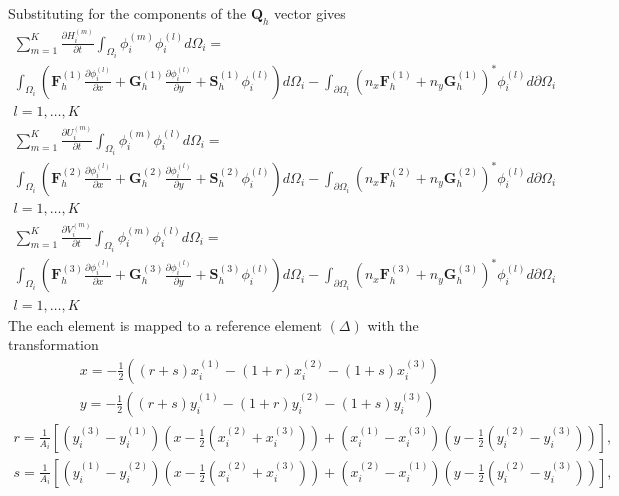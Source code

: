 \documentclass[11pt]{article}
\begin{document}
Substituting for the components of the $\mathbf{Q}_h$ vector gives 
\begin{multline}
\displaystyle\sum_{m=1}^K\frac{\partial H_i^{(m)}}{\partial t}\int_{\Omega_i}\phi_i^{(m)}\phi_i^{(l)} d\Omega_i = \\ \int_{\Omega_i}\left(\mathbf{F}^{(1)}_h\frac{\partial \phi_i^{(l)}}{\partial x} + \mathbf{G}^{(1)}_h\frac{\partial \phi_i^{(l)}}{\partial y} + \mathbf{S}^{(1)}_h\phi_i^{(l)} \right)d\Omega_i - \int_{\partial \Omega_i} \left(n_x\mathbf{F}^{(1)}_h + n_y\mathbf{G}^{(1)}_h\right)^*\phi_i^{(l)} d\partial \Omega_i  \\ l = 1,\ldots,K
\end{multline}
\begin{multline}
\displaystyle\sum_{m=1}^K\frac{\partial U_i^{(m)}}{\partial t}\int_{\Omega_i}\phi_i^{(m)}\phi_i^{(l)} d\Omega_i = \\ \int_{\Omega_i}\left(\mathbf{F}^{(2)}_h\frac{\partial \phi_i^{(l)}}{\partial x} + \mathbf{G}^{(2)}_h\frac{\partial \phi_i^{(l)}}{\partial y} + \mathbf{S}^{(2)}_h\phi_i^{(l)}\right)d\Omega_i - \int_{\partial \Omega_i} \left(n_x\mathbf{F}^{(2)}_h + n_y\mathbf{G}^{(2)}_h\right)^*\phi_i^{(l)} d\partial \Omega_i  \\ l = 1,\ldots,K
\end{multline}
\begin{multline}
\displaystyle\sum_{m=1}^K\frac{\partial V_i^{(m)}}{\partial t}\int_{\Omega_i}\phi_i^{(m)}\phi_i^{(l)} d\Omega_i = \\ \int_{\Omega_i}\left(\mathbf{F}^{(3)}_h\frac{\partial \phi_i^{(l)}}{\partial x} + \mathbf{G}^{(3)}_h\frac{\partial \phi_i^{(l)}}{\partial y} + \mathbf{S}^{(3)}_h\phi_i^{(l)}\right)d\Omega_i - \int_{\partial \Omega_i} \left(n_x\mathbf{F}^{(3)}_h + n_y\mathbf{G}^{(3)}_h\right)^*\phi_i^{(l)} d\partial \Omega_i   \\ l = 1,\ldots,K
\end{multline}
The each element is mapped to a reference element $(\Delta)$ with the transformation
\begin{align}
x = -\frac{1}{2} \left((r+s)x_i^{(1)} - (1+r)x_i^{(2)} - (1+s)x_i^{(3)} \right)\\
y = -\frac{1}{2} \left((r+s)y_i^{(1)} - (1+r)y_i^{(2)} - (1+s)y_i^{(3)} \right)
\end{align}
\begin{align}
r = \frac{1}{A_i}\left[\left(y_i^{(3)}-y_i^{(1)}\right)\left(x-\frac{1}{2}\left(x_i^{(2)} + x_i^{(3)} \right) \right) + \left(x_i^{(1)} - x_i^{(3)}\right)\left( y - \frac{1}{2} \left(y_i^{(2)}-y_i^{(3)} \right) \right) \right],\\
s = \frac{1}{A_i}\left[\left(y_i^{(1)}-y_i^{(2)}\right)\left(x-\frac{1}{2}\left(x_i^{(2)} + x_i^{(3)} \right) \right) + \left(x_i^{(2)} - x_i^{(1)}\right)\left( y - \frac{1}{2} \left(y_i^{(2)}-y_i^{(3)} \right) \right) \right],
\end{align}
\end{document}
